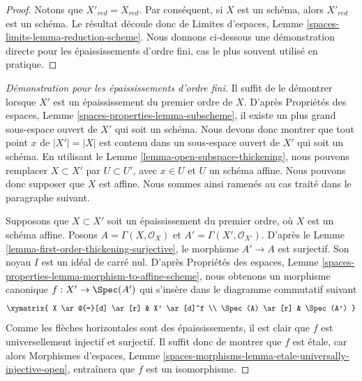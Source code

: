 \begin{proof}
Notons que $X'_{red} = X_{red}$. Par conséquent, si $X$ est un schéma, alors
$X'_{red}$ est un schéma. Le résultat découle donc de
Limites d'espaces, Lemme
\ref{spaces-limits-lemma-reduction-scheme}.
Nous donnons ci-dessous une démonstration directe pour les épaississements d'ordre fini,
cas le plus souvent utilisé en pratique.
\end{proof}

\begin{proof}[Démonstration pour les épaississements d'ordre fini]
Il suffit de le démontrer lorsque $X'$ est un épaississement du premier ordre de $X$. D'après
Propriétés des espaces, Lemme \ref{spaces-properties-lemma-subscheme},
il existe un plus grand sous-espace ouvert de $X'$ qui soit un schéma. Nous devons donc
montrer que tout point $x$ de $|X'| = |X|$ est contenu dans un sous-espace ouvert de
$X'$ qui soit un schéma. En utilisant le
Lemme \ref{lemma-open-subspace-thickening},
nous pouvons remplacer $X \subset X'$ par $U \subset U'$, avec $x \in U$ et $U$
un schéma affine. Nous pouvons donc supposer que $X$ est affine.
Nous sommes ainsi ramenés au cas traité dans le paragraphe suivant.

\medskip\noindent
Supposons que $X \subset X'$ soit un épaississement du premier ordre, où $X$ est un schéma
affine. Posons $A = \Gamma(X, \mathcal{O}_X)$ et
$A' = \Gamma(X', \mathcal{O}_{X'})$. D'après le
Lemme \ref{lemma-first-order-thickening-surjective},
le morphisme $A' \to A$ est surjectif. Son noyau $I$ est un idéal de carré nul. D'après
Propriétés des espaces,
Lemme \ref{spaces-properties-lemma-morphism-to-affine-scheme},
nous obtenons un morphisme canonique $f : X' \to \Spec(A')$ qui s'insère
dans le diagramme commutatif suivant
$$
\xymatrix{
X \ar@{=}[d] \ar[r] &  X' \ar[d]^f \\
\Spec(A) \ar[r] & \Spec(A')
}
$$
Comme les flèches horizontales sont des épaississements, il est clair que $f$ est
universellement injectif et surjectif. Il suffit donc de montrer que
$f$ est étale, car alors
Morphismes d'espaces,
Lemme \ref{spaces-morphisms-lemma-etale-universally-injective-open},
entraînera que $f$ est un isomorphisme.


\end{proof}
